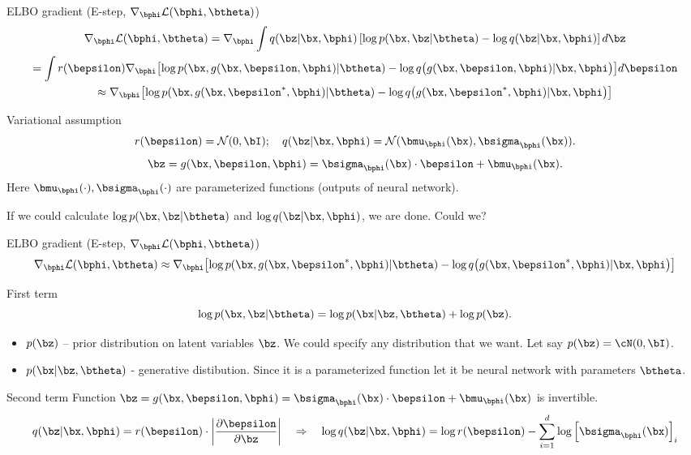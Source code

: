 \begin{frame}{ELBO gradient (E-step, $\nabla_{\bphi} \mathcal{L}(\bphi, \btheta)$)}
	\vspace{-0.7cm}
	\begin{multline*}
		\nabla_{\bphi} \mathcal{L} (\bphi, \btheta) = \nabla_{\bphi}\int q(\bz|\bx, \bphi) \left[\log p(\bx, \bz | \btheta)  - \log q(\bz | \bx, \bphi)\right] d\bz
		\\ = \int r(\bepsilon) \nabla_{\bphi} \bigl[\log p(\bx, g(\bx, \bepsilon, \bphi) | \btheta)  - \log q\bigl(g(\bx, \bepsilon, \bphi) | \bx, \bphi \bigr)\bigr]d\bepsilon
		\\ \approx \nabla_{\bphi} \bigl[\log p(\bx, g(\bx, \bepsilon^*, \bphi) | \btheta)  - \log q\bigl(g(\bx, \bepsilon^*, \bphi) | \bx, \bphi \bigr)\bigr]
	\end{multline*}
	\vspace{-0.7cm}
	\begin{block}{Variational assumption}
		\[
			r(\bepsilon) = \mathcal{N}(0, \bI); \quad  q(\bz| \bx, \bphi) = \mathcal{N} (\bmu_{\bphi}(\bx), \bsigma_{\bphi}(\bx)).
		\]
		\[
			\bz = g(\bx, \bepsilon, \bphi) = \bsigma_{\bphi}(\bx) \cdot \bepsilon + \bmu_{\bphi}(\bx).
		\]
		Here $\bmu_{\bphi}(\cdot), \bsigma_{\bphi}(\cdot)$ are parameterized functions (outputs of neural network).
	\end{block}
	If we could calculate $\log p(\bx, \bz | \btheta)$ and $\log q(\bz | \bx, \bphi)$, we are done. Could we?
\end{frame}
\begin{frame}{ELBO gradient (E-step, $\nabla_{\bphi} \mathcal{L}(\bphi, \btheta)$)}
	\vspace{-0.3cm}
	\[
		\nabla_{\bphi} \mathcal{L} (\bphi, \btheta) \approx \nabla_{\bphi} \bigl[\log p(\bx, g(\bx, \bepsilon^*, \bphi) | \btheta)  - \log q\bigl(g(\bx, \bepsilon^*, \bphi) | \bx, \bphi \bigr)\bigr]
	\]
	\vspace{-0.3cm}
	\begin{block}{First term}
		\vspace{-0.3cm}
		\[
			\log p(\bx, \bz | \btheta) = \log p(\bx | \bz, \btheta) + \log p(\bz).
		\]
		\vspace{-0.3cm}
		\begin{itemize}
			\item $p(\bz)$ -- prior distribution on latent variables $\bz$. We could specify any distribution that we want. Let say $p(\bz) = \cN (0, \bI)$.
			\item $p(\bx | \bz, \btheta)$ - generative distibution. Since it is a parameterized function let it be neural network with parameters $\btheta$.
		\end{itemize}
	\end{block}
	\begin{block}{Second term}
		Function $\bz = g(\bx, \bepsilon, \bphi)= \bsigma_{\bphi}(\bx) \cdot \bepsilon + \bmu_{\bphi}(\bx)$ is invertible.
		\[
			q(\bz | \bx, \bphi) = r(\bepsilon) \cdot \left| \frac{\partial \bepsilon}{\partial \bz}\right| \quad \Rightarrow \quad 
			\log q(\bz | \bx, \bphi) = \log r(\bepsilon) - \sum_{i=1}^d \log \left[\bsigma_{\bphi}(\bx) \right]_i
		\]
	\end{block}
	
\end{frame}
